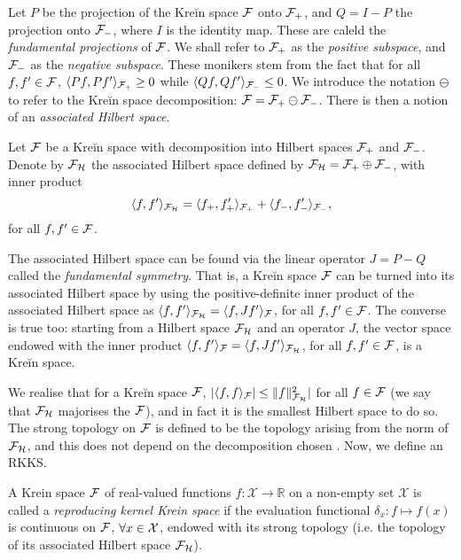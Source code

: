 Let $P$ be the projection of the Kreĭn space ${\mathcal F}$ onto ${\mathcal F}_+$, and $Q=I-P$ the projection onto ${\mathcal F}_-$, where $I$ is the identity map.
These are caleld the \emph{fundamental projections} of ${\mathcal F}$.
We shall refer to ${\mathcal F}_+$ as the \emph{positive subspace}, and ${\mathcal F}_-$ as the \emph{negative subspace}.
These monikers stem from the fact that for all $f,f' \in {\mathcal F}$, $\langle Pf,Pf'\rangle_{{\mathcal F}_+} \geq 0$ while $\langle Qf,Qf'\rangle_{{\mathcal F}_-} \leq 0$.
We introduce the notation $\ominus$ to refer to the Kreĭn space decomposition: ${\mathcal F} = {\mathcal F}_+ \ominus {\mathcal F}_-$.
There is then a notion of an \emph{associated Hilbert space}.

\begin{definition}
  Let ${\mathcal F}$ be a Kreĭn space with decomposition into Hilbert spaces ${\mathcal F}_+$ and ${\mathcal F}_-$.
  Denote by ${\mathcal F}_{\mathcal H}$ the associated Hilbert space defined by ${\mathcal F}_{\mathcal H} = {\mathcal F}_+ \oplus {\mathcal F}_-$, with inner product 
  \[
    \langle f,f'\rangle_{{\mathcal F}_{\mathcal H}} = \langle f_+,f_+'\rangle_{{\mathcal F}_+} + \langle f_-,f_-'\rangle_{{\mathcal F}_-},
  \]
  for all $f,f'\in{\mathcal F}$.
\end{definition}

The associated Hilbert space can be found via the linear operator $J = P - Q$ called the \emph{fundamental symmetry}.
That is, a Kreĭn space ${\mathcal F}$ can be turned into its associated Hilbert space by using the positive-definite inner product of the associated Hilbert space as $\langle f,f'\rangle_{{\mathcal F}_{\mathcal H}} = \langle f,Jf'\rangle_{\mathcal F}$, for all $f,f'\in{\mathcal F}$.
The converse is true too: starting from a Hilbert space ${\mathcal F}_{\mathcal H}$ and an operator $J$, the vector space endowed with the inner product $\langle f,f'\rangle_{\mathcal F} = \langle f,Jf'\rangle_{{\mathcal F}_{\mathcal H}}$, for all $f,f'\in{\mathcal F}$, is a Kreĭn space.

We realise that for a Kreĭn space ${\mathcal F}$, $|\langle f,f\rangle_{\mathcal F}| \leq \lVert f\rVert^2_{{\mathcal F}_{\mathcal H}}|$ for all $f\in{\mathcal F}$ (we say that ${\mathcal F}_{\mathcal H}$ majorises the ${\mathcal F}$), and in fact it is the smallest Hilbert space to do so.
The strong topology on ${\mathcal F}$ is defined to be the topology arising from the norm of ${\mathcal F}_{\mathcal H}$, and this does not depend on the decomposition chosen \citep{ong2004learning}.
Now, we define an RKKS.

\begin{definition}
  A Krein space ${\mathcal F}$ of real-valued functions $f:\mathcal X \rightarrow \mathbb R$ on a non-empty set $\mathcal X$ is called a \emph{reproducing kernel Krein space} if the evaluation functional $\delta_x: f \mapsto f(x)$ is continuous on ${\mathcal F}$, $\forall x \in {\mathcal X}$, endowed with its strong topology (i.e. the topology of its associated Hilbert space ${\mathcal F}_{\mathcal H}$).
\end{definition}

